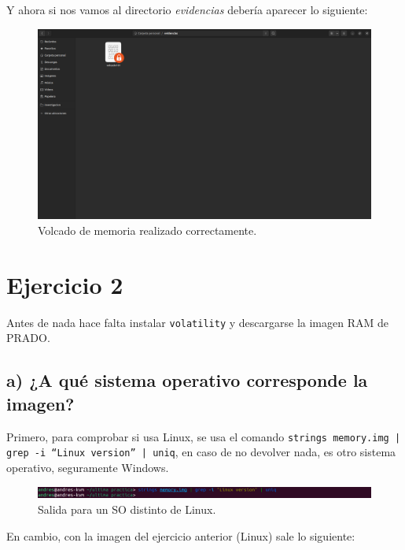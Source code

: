 \documentclass{article}
\begin{document}
Y ahora si nos vamos al directorio \textit{evidencias} debería aparecer lo siguiente:

\begin{figure}[H]
    \centering
    \includegraphics[width=\textwidth]{imagenes/Captura desde 2022-12-06 11-42-47.png}
    \caption{Volcado de memoria realizado correctamente.}
\end{figure}

\newpage
\section{Ejercicio 2}

Antes de nada hace falta instalar \verb|volatility| y descargarse la imagen RAM de PRADO.

\subsection{a) ¿A qué sistema operativo corresponde la imagen?}

Primero, para comprobar si usa Linux, se usa el comando \texttt{strings memory.img | grep -i ``Linux version'' | uniq}, en caso de no devolver nada, es otro sistema operativo, seguramente Windows.

\begin{figure}[H]
    \centering
    \includegraphics[width=\textwidth]{imagenes/Captura desde 2022-12-06 12-56-51.png}
    \caption{Salida para un SO distinto de Linux.}
\end{figure}

En cambio, con la imagen del ejercicio anterior (Linux) sale lo siguiente:
\end{document}
